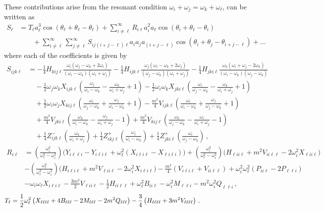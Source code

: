 \documentclass[letterpaper,11pt]{article}
\newcommand{\oi}{\omega_i}
\newcommand{\oj}{\omega_j}
\newcommand{\ok}{\omega_k}
\newcommand{\ol}{\omega_\ell}
\newcommand{\thi}{\theta_i}
\newcommand{\thj}{\theta_j}
\newcommand{\thl}{\theta_\ell}
\begin{document}
These contributions arise from the resonant condition $\oi + \oj = \ok + \ol$, can be written as
\begin{align}
S_\ell &= T_\ell a^3_\ell \cos (\thl + \thl - \thl) + \sum_{i \neq \ell}^\infty R_{i \ell} a^2_i a_\ell \cos(\thi + \thl - \thi) \nonumber \\
& \qquad + \sum_{i \neq \ell}^\infty \sum_{j \neq \ell}^\infty S_{i j (i + j - \ell) \ell} a_i a_j a_{(i + j - \ell)} \cos(\thi + \thj - \theta_{i + j -\ell} ) + \ldots
\end{align}
where each of the coefficients is given by
\begin{align}
S_{ijk\ell} &= - \frac{1}{4} H_{kij\ell} \frac{\oi (\oj - \ok + 2\oi)}{(\oi - \ok)(\oi + \oj)} -\frac{1}{4} H_{ijk\ell} \frac{\oj (\oi - \ok + 2\oj)}{(\oj - \ok)(\oi + \oj)} - \frac{1}{4} H_{jki\ell} \frac{\ok ( \oi + \oj - 2\ok)}{(\oi - \ok)(\oj - \ok)} \nonumber \\
%
& \quad - \frac{1}{2} \oj \ok X_{ijk\ell} \left( \frac{\oj}{\oi - \ok} - \frac{\ok}{\oi + \oj} + 1 \right) - \frac{1}{2} \oi \ok X_{jki\ell} \left( \frac{\oi}{\oj - \ok} - \frac{\ok}{\oi + \oj} + 1 \right) \nonumber \\
%
& \quad + \frac{1}{2} \oi \oj X_{kij\ell} \left( \frac{\oi}{\oj - \ok} + \frac{\oj}{\oi - \ok} + 1 \right) - \frac{m^2}{4} V_{ijk\ell} \left( \frac{\oi}{\oi - \ok} + \frac{\oj}{\oj - \ok} + 1\right) \nonumber \\
%
& \quad + \frac{m^2}{4} V_{jki\ell} \left( \frac{\ok}{\oi - \ok} - \frac{\oj}{\oi + \oj} - 1 \right) + \frac{m^2}{4} V_{kij\ell} \left( \frac{\ok}{\oj - \ok} - \frac{\oi}{\oi + \oj} - 1 \right) \nonumber \\
%
& \quad + \frac{1}{4}  Z^-_{ijk\ell} \left( \frac{\ok}{\oi + \oj}\right)  + \frac{1}{4}  Z^+_{ikj\ell} \left( \frac{\oj}{\oi - \ok}\right) + \frac{1}{4} Z^+_{jki\ell} \left( \frac{\oi}{\oj - \ok} \right) \, ,
\end{align}
\begin{align}
R_{i\ell} &= \left(\frac{\oi^2}{\ol^2 - \oi^2} \right) \big( Y_{i\ell \ell i} - Y_{i\ell i \ell} + \ol^2 ( X_{i\ell i \ell} - X_{\ell i \ell i}) \big) + \left(\frac{\oi^2}{\ol^2 - \oi^2}\right) \big( H_{\ell i i\ell} + m^2 V_{ii\ell \ell} - 2\oi^2 X_{\ell i i \ell} \big) \nonumber \\
%
& - \left(\frac{\ol^2}{\ol^2 - \oi^2} \right) \big( H_{i\ell i \ell} + m^2 V_{\ell i i \ell} - 2\oi^2 X_{i\ell i\ell} \big) - \frac{m^2}{4}(V_{i\ell i \ell} + V_{ii\ell \ell} ) + \oi^2 \ol^2 (P_{ii\ell} - 2P_{\ell \ell i}) \nonumber \\
%
& - \oi\ol X_{i\ell i \ell} - \frac{3m^2}{2} V_{\ell ii \ell} - \frac{1}{2} H_{ii\ell \ell} + \ol^2 B_{ii\ell} - \oi^2 M_{\ell \ell i} - m^2 \oi^2 Q_{\ell \ell i} \, ,
\end{align}
\begin{align}
T_{\ell} &= \frac{1}{2} \ol^2 \left( X_{\ell \ell \ell \ell} + 4 B_{\ell \ell \ell} -2 M_{\ell \ell \ell} - 2m^2 Q_{\ell \ell \ell} \right) -\frac{3}{4} \left( H_{\ell \ell \ell \ell} + 3m^2 V_{\ell \ell \ell \ell} \right) \, . \hspace{1.0in}
\end{align}
\end{document}
